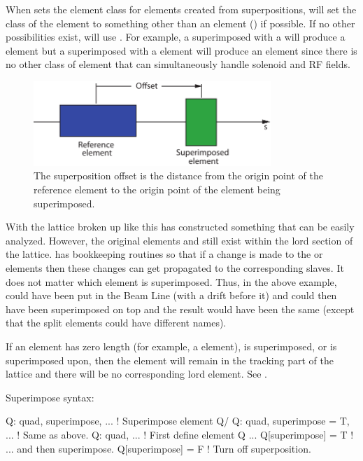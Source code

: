 When \bmad sets the element class for elements created from
superpositions, \bmad will set the class of the element to something
other than an  element () if
possible. If no other possibilities exist, \bmad will use
. For example, a  superimposed with a
 will produce a  element but a 
superimposed with a  element will produce an
 element since there is no other class of element that
can simultaneously handle solenoid and RF fields.

  \begin{figure}[tb]
  \centering 
  \includegraphics[width=0.8\textwidth]{superimpose.pdf} 
  \caption[Superposition Offset.]{
The superposition offset is the distance from the origin point of the
reference element to the origin point of the element being
superimposed.
  }
  \label{f:superimpose}
  \end{figure}

With the lattice broken up like this \bmad has constructed something
that can be easily analyzed. However, the original elements  and
 still exist within the lord section of the lattice. \bmad has
bookkeeping routines so that if a change is made to the  or
 elements then these changes can get propagated to the
corresponding slaves. It does not matter which element is
superimposed. Thus, in the above example,  could have been put
in the Beam Line (with a drift before it) and  could then have
been superimposed on top and the result would have been the same
(except that the split elements could have different names).

If an element has zero length (for example, a
 element), is superimposed, or is superimposed upon, then the
element will remain in the tracking part of the lattice and there will be
no corresponding lord element. See .
 
Superimpose syntax:
\begin{example}
  Q: quad, superimpose, ...       ! Superimpose element Q/
  Q: quad, superimpose = T, ...   ! Same as above.
  Q: quad, ...                    ! First define element Q ...
  Q[superimpose] = T              !   ... and then superimpose.
  Q[superimpose] = F              ! Turn off superposition.
\end{example}

